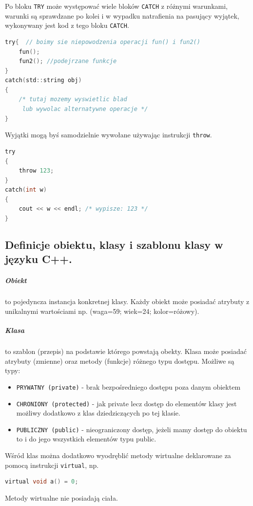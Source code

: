 \documentclass[a4paper,12pt,oneside]{book}
\begin{document}
				Po bloku \verb*|TRY| może występować wiele bloków \verb*|CATCH| z różnymi warunkami, warunki są sprawdzane po kolei i w wypadku natrafienia na pasujący wyjątek, wykonywany jest kod z tego bloku \verb*|CATCH|.\\
				\begin{lstlisting}[language=C]
try{  // boimy sie niepowodzenia operacji fun() i fun2()
    fun(); 
    fun2(); //podejrzane funkcje 
} 
catch(std::string obj) 
{ 
    /* tutaj mozemy wyswietlic blad
     lub wywolac alternatywne operacje */
}
				\end{lstlisting}
				
				Wyjątki mogą byś samodzielnie wywołane używając instrukcji \verb*|throw|.
				\begin{lstlisting}[language=C]
try 
{ 
    throw 123; 
} 
catch(int w) 
{ 
    cout << w << endl; /* wypisze: 123 */
} 

				\end{lstlisting}
			
			\newpage\subsection{Definicje obiektu, klasy i szablonu klasy w języku C++.}
				\subparagraph{Obiekt}to pojedyncza instancja konkretnej klasy. Każdy obiekt może posiadać atrybuty z unikalnymi wartościami np. (waga=59; wiek=24; kolor=różowy).\\
				
				\subparagraph{Klasa}to szablon (przepis) na podstawie którego powstają obekty. Klasa może posiadać atrybuty (zmienne) oraz metody (funkcje) różnego typu dostępu. Możliwe są typy:
				\begin{itemize}
					\item \verb*|PRYWATNY (private)| - brak bezpośredniego dostępu poza danym obiektem
					\item \verb*|CHRONIONY (protected)| - jak private lecz dostęp do elementów klasy jest możliwy dodatkowo z klas dziedziczących po tej klasie.
					\item \verb*|PUBLICZNY (public)| - nieograniczony dostęp, jeżeli mamy dostęp do obiektu to i do jego wszystkich elementów typu public.
				\end{itemize}
			
				Wśród klas można dodatkowo wyodręblić metody wirtualne deklarowane za pomocą instrukcji \verb*|virtual|, np.
				\begin{lstlisting}[language=C]
	virtual void a() = 0;
				\end{lstlisting}
				Metody wirtualne nie posiadają ciała.\\
				
\end{document}
